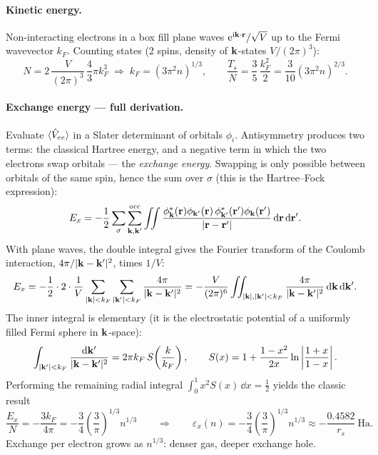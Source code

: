 \paragraph{Kinetic energy.} Non-interacting electrons in a box fill plane
waves $\mathrm{e}^{\mathrm{i}\mathbf{k}\cdot\mathbf{r}}/\sqrt{V}$ up to the Fermi wavevector $k_F$.
Counting states (2 spins, density of $\mathbf{k}$-states $V/(2\pi)^3$):
\begin{equation}
N = 2\,\frac{V}{(2\pi)^3}\,\frac{4}{3}\pi k_F^3
\;\Longrightarrow\;
k_F = (3\pi^2 n)^{1/3},
\qquad
\frac{T_s}{N} = \frac{3}{5}\,\frac{k_F^2}{2}
= \frac{3}{10}(3\pi^2 n)^{2/3}.
\label{eq:heg_ts}
\end{equation}

\paragraph{Exchange energy --- full derivation.}
Evaluate $\braket{\hat V_{ee}}$ in a Slater determinant of orbitals
$\phi_i$. Antisymmetry produces two terms: the classical Hartree energy,
and a negative term in which the two electrons swap orbitals --- the
\emph{exchange energy}. Swapping is only possible between orbitals of the
same spin, hence the sum over $\sigma$ (this is the Hartree--Fock
expression):
\begin{equation}
E_x = -\frac{1}{2} \sum_{\sigma} \sum_{\mathbf{k},\mathbf{k}'}^{\mathrm{occ}}
\iint \frac{\phi_{\mathbf{k}}^*(\mathbf{r})\phi_{\mathbf{k}'}(\mathbf{r})\,
\phi_{\mathbf{k}'}^*(\mathbf{r}')\phi_{\mathbf{k}}(\mathbf{r}')}{|\mathbf{r}-\mathbf{r}'|}\,\mathrm{d}\mathbf{r}\,\mathrm{d}\mathbf{r}'.
\end{equation}
With plane waves, the double integral gives the Fourier transform of the
Coulomb interaction, $4\pi/|\mathbf{k} - \mathbf{k}'|^2$, times $1/V$:
\begin{equation}
E_x = -\frac{1}{2}\cdot 2 \cdot \frac{1}{V}
\sum_{|\mathbf{k}|<k_F}\sum_{|\mathbf{k}'|<k_F} \frac{4\pi}{|\mathbf{k}-\mathbf{k}'|^2}
= -\frac{V}{(2\pi)^6}
\iint_{|\mathbf{k}|,|\mathbf{k}'|<k_F} \frac{4\pi}{|\mathbf{k}-\mathbf{k}'|^2}\,\mathrm{d}\mathbf{k}\,\mathrm{d}\mathbf{k}'.
\end{equation}
The inner integral is elementary (it is the electrostatic potential of a
uniformly filled Fermi sphere in $\mathbf{k}$-space):
\begin{equation}
\int_{|\mathbf{k}'|<k_F} \frac{\mathrm{d}\mathbf{k}'}{|\mathbf{k} - \mathbf{k}'|^2}
= 2\pi k_F\, S\!\left(\frac{k}{k_F}\right),
\qquad
S(x) = 1 + \frac{1-x^2}{2x}\ln\left|\frac{1+x}{1-x}\right| .
\end{equation}
Performing the remaining radial integral
$\int_0^1 x^2 S(x)\,\dd x = \tfrac12$ yields the classic result
\begin{equation}
\frac{E_x}{N}
= -\frac{3 k_F}{4\pi}
= -\frac{3}{4}\left(\frac{3}{\pi}\right)^{1/3} n^{1/3}
\qquad\Longrightarrow\qquad
\varepsilon_x(n) = -\frac{3}{4}\left(\frac{3}{\pi}\right)^{1/3} n^{1/3}
\approx -\frac{0.4582}{r_s}\ \mathrm{Ha}.
\label{eq:ldax}
\end{equation}
Exchange per electron grows as $n^{1/3}$: denser gas, deeper exchange hole.

